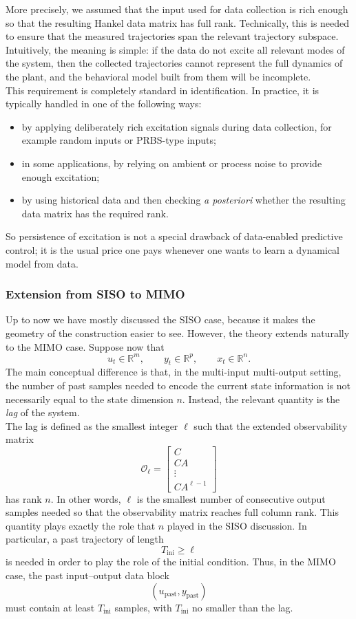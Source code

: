 More precisely, we assumed that the input used for data collection is rich enough so that the resulting Hankel data matrix has full rank. Technically, this is needed to ensure that the measured trajectories span the relevant trajectory subspace. Intuitively, the meaning is simple: if the data do not excite all relevant modes of the system, then the collected trajectories cannot represent the full dynamics of the plant, and the behavioral model built from them will be incomplete.\\
This requirement is completely standard in identification. In practice, it is typically handled in one of the following ways:
\begin{itemize}
    \item by applying deliberately rich excitation signals during data collection, for example random inputs or PRBS-type inputs;
    \item in some applications, by relying on ambient or process noise to provide enough excitation;
    \item by using historical data and then checking \emph{a posteriori} whether the resulting data matrix has the required rank.
\end{itemize}
So persistence of excitation is not a special drawback of data-enabled predictive control; it is the usual price one pays whenever one wants to learn a dynamical model from data.\\
\subsubsection{Extension from SISO to MIMO}
Up to now we have mostly discussed the SISO case, because it makes the geometry of the construction easier to see. However, the theory extends naturally to the MIMO case. Suppose now that
\[
u_t\in\mathbb{R}^m,\qquad y_t\in\mathbb{R}^p,\qquad x_t\in\mathbb{R}^n.
\]
The main conceptual difference is that, in the multi-input multi-output setting, the number of past samples needed to encode the current state information is not necessarily equal to the state dimension \(n\). Instead, the relevant quantity is the \emph{lag} of the system.\\
The lag is defined as the smallest integer \(\ell\) such that the extended observability matrix
\[
\mathcal{O}_{\ell}=
\begin{bmatrix}
C\\
CA\\
\vdots\\
CA^{\ell-1}
\end{bmatrix}
\]
has rank \(n\). In other words, \(\ell\) is the smallest number of consecutive output samples needed so that the observability matrix reaches full column rank. This quantity plays exactly the role that \(n\) played in the SISO discussion. In particular, a past trajectory of length
\[
T_{\mathrm{ini}}\geq \ell
\]
is needed in order to play the role of the initial condition. Thus, in the MIMO case, the past input--output data block
\[
(u_{\mathrm{past}},y_{\mathrm{past}})
\]
must contain at least \(T_{\mathrm{ini}}\) samples, with \(T_{\mathrm{ini}}\) no smaller than the lag.\\

